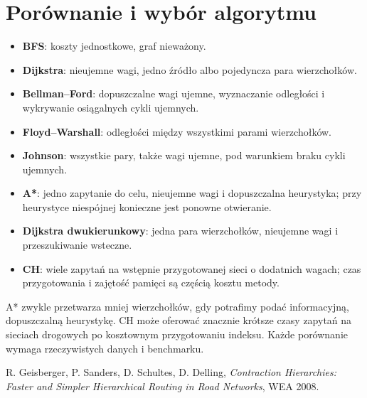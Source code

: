 \section{Porównanie i wybór algorytmu}
\label{sec:tg-weighted-summary}

\begin{itemize}[leftmargin=2em,itemsep=3pt]
\item \textbf{BFS}: koszty jednostkowe, graf nieważony.
\item \textbf{Dijkstra}: nieujemne wagi, jedno źródło
      albo pojedyncza para wierzchołków.
\item \textbf{Bellman--Ford}: dopuszczalne wagi ujemne,
      wyznaczanie odległości i wykrywanie osiągalnych cykli ujemnych.
\item \textbf{Floyd--Warshall}: odległości między
      wszystkimi parami wierzchołków.
\item \textbf{Johnson}: wszystkie pary, także wagi ujemne,
      pod warunkiem braku cykli ujemnych.
\item \textbf{A*}: jedno zapytanie do celu, nieujemne
      wagi i dopuszczalna heurystyka; przy heurystyce
      niespójnej konieczne jest ponowne otwieranie.
\item \textbf{Dijkstra dwukierunkowy}: jedna para wierzchołków,
      nieujemne wagi i przeszukiwanie wsteczne.
\item \textbf{CH}: wiele zapytań na wstępnie przygotowanej
      sieci o dodatnich wagach; czas przygotowania
      i zajętość pamięci są częścią kosztu metody.
\end{itemize}

A* zwykle przetwarza mniej
wierzchołków, gdy potrafimy
podać informacyjną,
dopuszczalną heurystykę.
CH może oferować
znacznie krótsze czasy
zapytań na sieciach
drogowych po kosztownym
przygotowaniu indeksu.
Każde porównanie
wymaga rzeczywistych
danych i benchmarku.

\begin{uwaga}[Literatura]
R. Geisberger, P. Sanders,
D. Schultes, D. Delling,
\emph{Contraction Hierarchies:
Faster and Simpler Hierarchical
Routing in Road Networks},
WEA 2008.
\end{uwaga}

